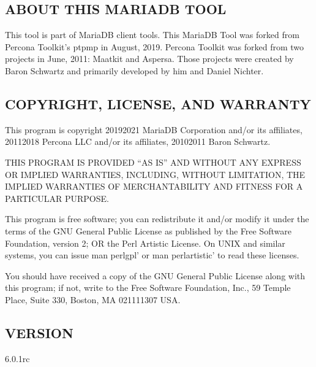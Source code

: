 \documentclass[letterpaper,10pt,english]{sphinxmanual}
\begin{document}
\section{ABOUT THIS MARIADB TOOL}
\label{\detokenize{mariadb-stacktrace:about-this-mariadb-tool}}
\sphinxAtStartPar
This tool is part of MariaDB client tools. This MariaDB Tool was forked from
Percona Toolkit’s pt\sphinxhyphen{}pmp in August, 2019. Percona Toolkit was forked from two
projects in June, 2011: Maatkit and Aspersa.  Those projects were created by
Baron Schwartz and primarily developed by him and Daniel Nichter.


\section{COPYRIGHT, LICENSE, AND WARRANTY}
\label{\detokenize{mariadb-stacktrace:copyright-license-and-warranty}}
\sphinxAtStartPar
This program is copyright 2019\sphinxhyphen{}2021 MariaDB Corporation and/or its affiliates,
2011\sphinxhyphen{}2018 Percona LLC and/or its affiliates, 2010\sphinxhyphen{}2011 Baron Schwartz.

\sphinxAtStartPar
THIS PROGRAM IS PROVIDED “AS IS” AND WITHOUT ANY EXPRESS OR IMPLIED
WARRANTIES, INCLUDING, WITHOUT LIMITATION, THE IMPLIED WARRANTIES OF
MERCHANTABILITY AND FITNESS FOR A PARTICULAR PURPOSE.

\sphinxAtStartPar
This program is free software; you can redistribute it and/or modify it under
the terms of the GNU General Public License as published by the Free Software
Foundation, version 2; OR the Perl Artistic License.  On UNIX and similar
systems, you can issue \textasciigrave{}man perlgpl’ or \textasciigrave{}man perlartistic’ to read these
licenses.

\sphinxAtStartPar
You should have received a copy of the GNU General Public License along with
this program; if not, write to the Free Software Foundation, Inc., 59 Temple
Place, Suite 330, Boston, MA  02111\sphinxhyphen{}1307  USA.


\section{VERSION}
\label{\detokenize{mariadb-stacktrace:version}}
\sphinxAtStartPar
{} 6.0.1rc


\chapter{}
\label{\detokenize{mariadb-stat:mariadb-stat}}\label{\detokenize{mariadb-stat::doc}}
\end{document}
